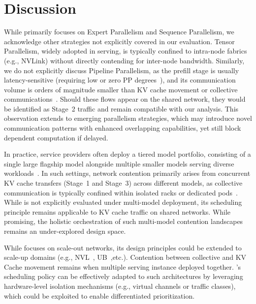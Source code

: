 \section{Discussion}

 While \sys primarily focuses on Expert Parallelism and Sequence Parallelism, we acknowledge other strategies not explicitly covered in our evaluation. Tensor Parallelism, widely adopted in serving, is typically confined to intra-node fabrics (e.g., NVLink) without directly contending for inter-node bandwidth. Similarly, we do not explicitly discuss Pipeline Parallelism, as the prefill stage is usually latency-sensitive (requiring low or zero PP degrees~\cite{distserve}), and its communication volume is orders of magnitude smaller than KV cache movement or collective communications~\cite{liao2025mixnet}. Should these flows appear on the shared network, they would be identified as Stage~2 traffic and remain compatible with our analysis. This observation extends to emerging parallelism strategies, which may introduce novel communication patterns with enhanced overlapping capabilities, yet still block dependent computation if delayed.

In practice, service providers often deploy a tiered model portfolio, consisting of a single large flagship model alongside multiple smaller models serving diverse workloads~\cite{openai2024gpt4}.
In such settings, network contention primarily arises from concurrent KV cache transfers (Stage~1 and Stage~3) across different models, as collective communication is typically confined within isolated racks or dedicated pods~\cite{deepseektech}.
While \sys{} is not explicitly evaluated under multi-model deployment, its scheduling principle remains applicable to KV cache traffic on shared networks.
While promising, the holistic orchestration of such multi-model contention landscapes remains an under-explored design space.

 While \sys focuses on scale-out networks, its design principles could be extended to scale-up domains (e.g., NVL~\cite{nvidia_gb200_nvl72}, UB~\cite{huawei384},etc.). Contention between collective and KV Cache movement remains when multiple serving instance deployed together. \sys's scheduling policy can be effectively adapted to such architectures by leveraging hardware-level isolation mechanisms (e.g., virtual channels or traffic classes), which could be exploited to enable differentiated prioritization.

